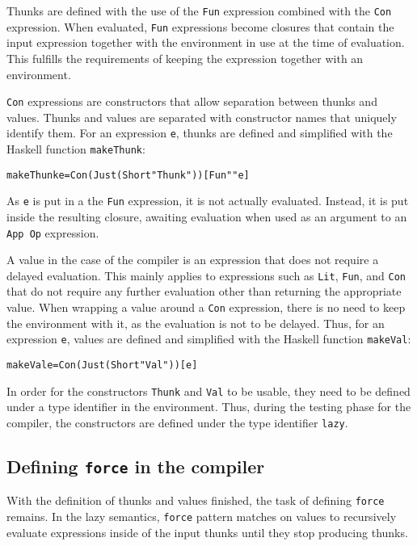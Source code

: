Thunks are defined with the use of the \texttt{Fun} expression combined
with the \texttt{Con} expression. When evaluated, \texttt{Fun} expressions
become closures that contain the input expression together with the environment
in use at the time of evaluation. This fulfills the requirements of keeping
the expression together with an environment.

\texttt{Con} expressions are constructors that allow separation between thunks
and values. Thunks and values are separated with constructor names that
uniquely identify them. For an expression \texttt{e}, thunks are defined and
simplified with the Haskell function \texttt{makeThunk}:

\begin{alltt}
  makeThunk e = Con (Just (Short "Thunk")) [Fun "" e]
\end{alltt}

\noindent As \texttt{e} is put in a the \texttt{Fun} expression, it is not
actually evaluated. Instead, it is put inside the resulting closure, awaiting
evaluation when used as an argument to an \texttt{App Op} expression.

A value in the case of the compiler is an expression that does not require
a delayed evaluation. This mainly applies to expressions such as \texttt{Lit},
\texttt{Fun}, and \texttt{Con} that do not require any further evaluation other
than returning the appropriate value. When wrapping
a value around a \texttt{Con} expression, there
is no need to keep the environment with it, as the evaluation is not to be
delayed. Thus, for an expression \texttt{e}, values are defined and simplified
with the Haskell function \texttt{makeVal}:

\begin{alltt}
  makeVal e = Con (Just (Short "Val")) [e]
\end{alltt}

In order for the constructors \texttt{Thunk} and \texttt{Val} to be usable,
they need to be defined under a type identifier in the environment. Thus,
during the testing phase for the compiler, the constructors are defined under
the type identifier \texttt{lazy}.

\subsection{Defining \texttt{force} in the compiler}
With the definition of thunks and values finished, the task of defining
\texttt{force} remains. In the lazy semantics, \texttt{force} pattern
matches on values to recursively evaluate expressions inside of the input thunks
until they stop producing thunks.

